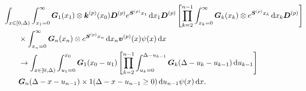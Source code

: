 \begin{align}
	&\int_{x\in[0,\Delta)} \int_{x_1=0}^\infty \bs G_1(x_1) \otimes \bs k^{(p)} (x_0) \bs D^{(p)} e^{\bs{S}^{(p)}x_1}\wrt x_1\bs D^{(p)} 
			\left[\prod_{k=2}^{n-1}\int_{x_k=0}^\infty \bs G_{k}(x_k) \otimes e^{\bs{S}^{(p)}x_k} \wrt x_k
	\bs D^{(p)} \right] \nonumber 
			\\&\qquad{}\times\int_{x_n=0}^\infty \bs G_{n}(x_n) \otimes e^{\bs{S}^{(p)}x_n} \wrt x_n {\bs v}^{(p)}(x) \psi(x)\wrt x \nonumber 
%
	\\&\qquad {}\to \int_{x\in[0,\Delta)} \int_{u_1=0}^{x_0}\bs G_1(x_0 - u_1)
	\left[\prod_{k=2}^{n-1} \int_{u_k=0}^{\Delta-u_{k-1}} \bs {G}_{k}(\Delta-u_k-u_{k-1})\wrt u_{k-1}\right] \nonumber 
			\\&\qquad{} \bs G_{n}(\Delta - x-u_{n-1})
		 \times1(\Delta-x-u_{n-1}\geq0)\wrt u_{n-1}\psi(x)\wrt x.  \nonumber
\end{align}

